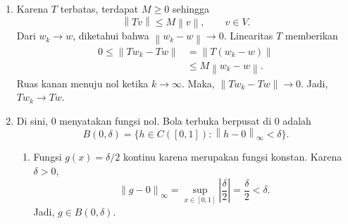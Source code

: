\documentclass[11pt,a4paper]{article}
\newcommand{\norm}[1]{\left\lVert #1\right\rVert}
\newcommand{\supnorm}[1]{\left\lVert #1\right\rVert_\infty}
\begin{document}
\begin{enumerate}[itemsep=12pt,parsep=5pt]
        Ambil $f,h\in C[0,1]$ dan skalar $\alpha,\beta$.
        Untuk setiap $x\in[0,1]$, berlaku
        \begin{align*}
          \bigl(T(\alpha f+\beta h)\bigr)(x)
           & =\int_0^x \bigl(\alpha f(t)+\beta h(t)\bigr)\,dt \\
           & =\alpha\int_0^x f(t)\,dt
          +\beta\int_0^x h(t)\,dt                             \\
           & =\alpha(Tf)(x)+\beta(Th)(x).
        \end{align*}
        Maka, $T(\alpha f+\beta h)=\alpha Tf+\beta Th$.
        Jadi, $T$ linear.

        Selanjutnya, untuk setiap $x\in[0,1]$,
        \begin{align*}
          |(Tf)(x)|
           & =\left|\int_0^x f(t)\,dt\right| \\
           & \le\int_0^x |f(t)|\,dt          \\
           & \le\int_0^x \supnorm{f}\,dt
          =x\supnorm{f}
          \le\supnorm{f}.
        \end{align*}
        Ambil supremum terhadap $x$.
        Diperoleh
        \[
          \supnorm{Tf}\le\supnorm{f}.
        \]
        Jadi, $T$ terbatas dengan konstanta batas $M=1$.

  \item Karena $T$ terbatas, terdapat $M\ge0$ sehingga
        \[
          \norm{Tv}\le M\norm{v},\qquad v\in V.
        \]
        Dari $w_k\to w$, diketahui bahwa $\norm{w_k-w}\to0$.
        Linearitas $T$ memberikan
        \begin{align*}
          0\le\norm{Tw_k-Tw}
           & =\norm{T(w_k-w)}   \\
           & \le M\norm{w_k-w}.
        \end{align*}
        Ruas kanan menuju nol ketika $k\to\infty$.
        Maka, $\norm{Tw_k-Tw}\to0$.
        Jadi, $Tw_k\to Tw$.

  \item Di sini, $0$ menyatakan fungsi nol.
        Bola terbuka berpusat di $0$ adalah
        \[
          B(0,\delta)=\{h\in C([0,1]):\supnorm{h-0}<\delta\}.
        \]
        \begin{enumerate}
          \item Fungsi $g(x)=\delta/2$ kontinu karena merupakan fungsi konstan.
                Karena $\delta>0$,
                \[
                  \supnorm{g-0}
                  =\sup_{x\in[0,1]}\left|\frac{\delta}{2}\right|
                  =\frac{\delta}{2}<\delta.
                \]
                Jadi, $g\in B(0,\delta)$.


\end{enumerate}
\end{enumerate}
\end{document}
